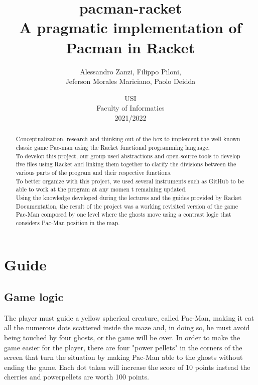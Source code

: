 \documentclass{article}
\title{
\textbf{pacman-racket} \\
A pragmatic implementation of Pacman in Racket
}
\author{
    Alessandro Zanzi,
    Filippo Piloni,\\
    Jeferson Morales Mariciano,
    Paolo Deidda
}
\date{
USI \\
Faculty of Informatics \\
[\baselineskip]  2021/2022
}
\begin{document}
\begin{titlepage}
\maketitle  

\end{titlepage}
  \begin{abstract}
Conceptualization, research and thinking out-of-the-box
to implement the well-known classic game Pac-man
using the Racket functional programming language.\\
To develop this project, our group used abstractions and open-source tools to develop five files using Racket and linking them together to clarify the divisions between the various parts of the program and their respective functions.\\
To better organize with this project, we used several instruments such as GitHub to be able to work at the program at any momen t remaining updated.\\
Using the knowledge developed during the lectures and the guides provided by Racket Documentation, the result of the project was a working revisited version of the game Pac-Man composed by one level where the ghosts move using a contrast logic that considers Pac-Man position in the map.

 \end{abstract}
 \clearpage
  \tableofcontents
 \clearpage

\section{Guide}

\subsection{Game logic}
 The player must guide a yellow spherical creature, called Pac-Man, making it eat all the numerous dots scattered inside the maze and, in doing so, he must avoid being touched by four ghosts, or the game will be over. In order to make the game easier for the player, there are four "power pellets" in the corners of the screen that turn the situation by making Pac-Man able to the ghosts without ending the game. Each dot taken will increase the score of 10 points instead the cherries and powerpellets are worth 100 points.
\end{document}
